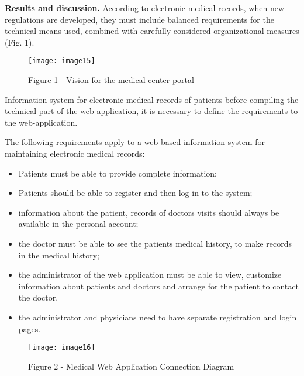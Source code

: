 \begin{multicols}{2}
{\bfseries Results and discussion.} According to electronic medical
records, when new regulations are developed, they must include balanced
requirements for the technical means used, combined with carefully
considered organizational measures (Fig. 1).

\end{multicols}

\begin{figure}[H]
  \centering
  \texttt{[image: image15]}
  \caption*{Figure 1 - Vision for the medical center portal}
\end{figure}

\begin{multicols}{2}

Information system for electronic medical records of patients before
compiling the technical part of the web-application, it is necessary to
define the requirements to the web-application.

The following requirements apply to a web-based information system for
maintaining electronic medical records:

\begin{itemize}
\item
  Patients must be able to provide complete information;
\item
  Patients should be able to register and then log in to the system;
\item
  information about the patient, records of doctor\textquotesingle s
  visits should always be available in the personal account;
\item
  the doctor must be able to see the patient\textquotesingle s medical
  history, to make records in the medical history;
\item
  the administrator of the web application must be able to view,
  customize information about patients and doctors and arrange for the
  patient to contact the doctor.
\item
  the administrator and physicians need to have separate registration
  and login pages.
\end{itemize}

\end{multicols}

\begin{figure}[H]
  \centering
  \texttt{[image: image16]}
  \caption*{Figure 2 - Medical Web Application Connection Diagram}
\end{figure}

